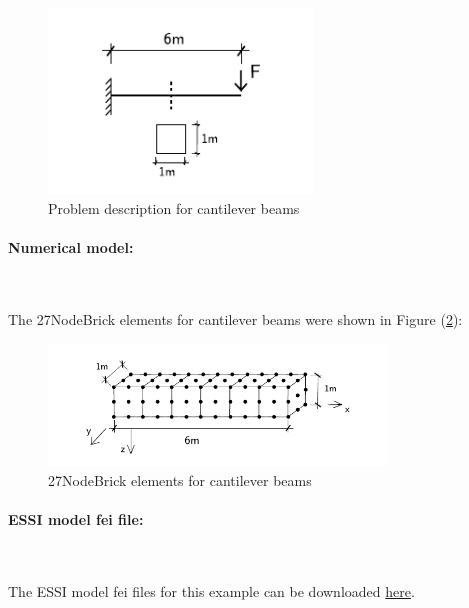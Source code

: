 \documentclass[fleqn,11pt]{article}
\begin{document}
\begin{figure}[H]
  \centering
  \includegraphics[width=7cm]{../Figure-files/cantilever_6.pdf}
  \caption{Problem description for cantilever beams}
  \label{fig Problem description for cantilever beams of different Poisson's 27}
\end{figure}

\paragraph{Numerical model:} ~

The 27NodeBrick elements for cantilever beams were shown in Figure (\ref{fig 27NodeBrick elements for cantilever beams of different Poisson's ratios}):
\begin{figure}[H]
  \centering
  \includegraphics[width=9cm]{../Figure-files/beam_27brick_6div.pdf}
  \caption{27NodeBrick elements for cantilever beams}
  \label{fig 27NodeBrick elements for cantilever beams of different Poisson's ratios}
\end{figure}

\paragraph{ESSI model fei file: } ~




The ESSI model fei files for this example can be downloaded \href{https://github.com/yuan-energy/Real-ESSI-Examples/blob/master/model_fei_file/27NodeBrick_cantilever_different_Poisson/27NodeBrick_cantilever_different_Poisson.tgz?raw=true}{here}.
\end{document}

